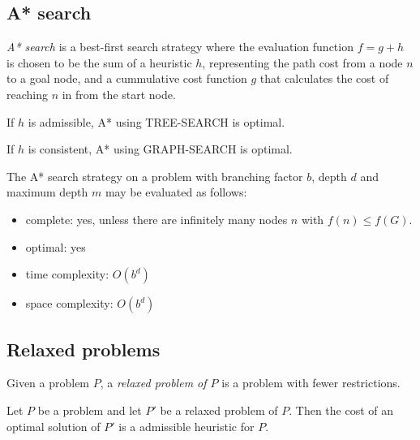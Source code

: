 \documentclass{article}
\begin{document}
\subsection{A* search}

\begin{definition}
    \emph{A* search} is a best-first search strategy where the evaluation
    function $f=g+h$ is chosen to be the sum of a heuristic $h$, representing the
    path cost from a node $n$ to a goal node, and a cummulative 
    cost function $g$ that calculates the cost of reaching $n$
    in from the start node.
\end{definition}


\begin{theorem}
    If $h$ is admissible, A* using TREE-SEARCH is optimal.
\end{theorem}

\begin{theorem}
    If $h$ is consistent, A* using GRAPH-SEARCH is optimal.
\end{theorem}

\begin{theorem}
    The A* search strategy on a problem with branching factor $b$, depth $d$
    and maximum depth $m$ may be evaluated as follows:
    \begin{itemize}
        \item complete: yes, unless there are infinitely many nodes $n$ with $f(n) \leq f(G)$.
        \item optimal: yes
        \item time complexity: $O(b^d)$
        \item space complexity: $O(b^d)$
    \end{itemize}
\end{theorem}

\subsection{Relaxed problems}

\begin{definition}
    Given a problem $P$, a \emph{relaxed problem of $P$} is a problem with
    fewer restrictions.
\end{definition}

\begin{theorem}
    Let $P$ be a problem and let $P'$ be a relaxed problem of $P$. Then
    the cost of an optimal solution of $P'$ is a admissible heuristic
    for $P$.
\end{theorem}
\end{document}
